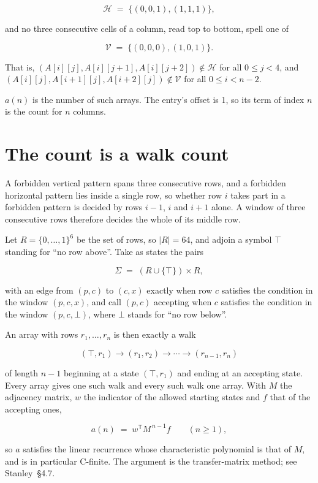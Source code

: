 \documentclass[11pt]{article}
\theoremstyle{definition}
\begin{document}
\[\mathcal{H} \;=\; \{(0,0,1), (1,1,1)\},\]

and no three consecutive cells of a column, read top to bottom, spell one of

\[\mathcal{V} \;=\; \{(0,0,0), (1,0,1)\}.\]

That is, $(A[i][j],A[i][j{+}1],A[i][j{+}2]) \notin \mathcal{H}$ for all $0 \le j < 4$, and $(A[i][j],A[i{+}1][j],A[i{+}2][j]) \notin \mathcal{V}$ for all $0 \le i < n-2$.

$a(n)$ is the number of such arrays. The entry's offset is 1, so its term of index $n$ is the count for $n$ columns.

\section{The count is a walk count}

A forbidden vertical pattern spans three consecutive rows, and a forbidden horizontal pattern lies inside a single row, so whether row $i$ takes part in a forbidden pattern is decided by rows $i-1$, $i$ and $i+1$ alone. A window of three consecutive rows therefore decides the whole of its middle row.

Let $R = \{0,\dots,1\}^{6}$ be the set of rows, so $|R| = 64$, and adjoin a symbol $\top$ standing for ``no row above''. Take as states the pairs

\[\Sigma \;=\; (R \cup \{\top\}) \times R,\]

with an edge from $(p,c)$ to $(c,x)$ exactly when row $c$ satisfies the condition in the window $(p,c,x)$, and call $(p,c)$ accepting when $c$ satisfies the condition in the window $(p,c,\bot)$, where $\bot$ stands for ``no row below''.

An array with rows $r_1,\dots,r_n$ is then exactly a walk

\[(\top,r_1) \to (r_1,r_2) \to \cdots \to (r_{n-1},r_n)\]

of length $n-1$ beginning at a state $(\top,r_1)$ and ending at an accepting state. Every array gives one such walk and every such walk one array. With $M$ the adjacency matrix, $w$ the indicator of the allowed starting states and $f$ that of the accepting ones,

\[a(n) \;=\; w^{\mathsf T} M^{\,n-1} f \qquad (n \ge 1),\]

so $a$ satisfies the linear recurrence whose characteristic polynomial is that of $M$, and is in particular C-finite. The argument is the transfer-matrix method; see Stanley~\S4.7.
\end{document}
